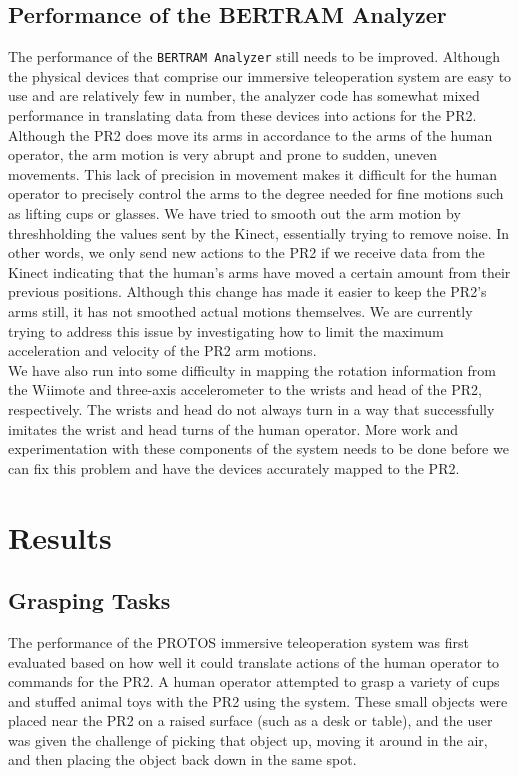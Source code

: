 \documentclass{sig-alternate}
\begin{document}
\subsection {Performance of the BERTRAM Analyzer}
\indent The performance of the {\tt BERTRAM Analyzer} still needs to be improved. Although the physical devices that comprise our immersive teleoperation system are easy to use and are relatively few in number, the analyzer code has somewhat mixed performance in translating data from these devices into actions for the PR2. Although the PR2 does move its arms in accordance to the arms of the human operator, the arm motion is very abrupt and prone to sudden, uneven movements. This lack of precision in movement makes it difficult for the human operator to precisely control the arms to the degree needed for fine motions such as lifting cups or glasses. We have tried to smooth out the arm motion by threshholding the values sent by the Kinect, essentially trying to remove noise. In other words, we only send new actions to the PR2 if we receive data from the Kinect indicating that the human's arms have moved a certain amount from their previous positions. Although this change has made it easier to keep the PR2's arms still, it has not smoothed actual motions themselves. We are currently trying to address this issue by investigating how to limit the maximum acceleration and velocity of the PR2 arm motions.\\
\indent We have also run into some difficulty in mapping the rotation information from the Wiimote and three-axis accelerometer to the wrists and head of the PR2, respectively. The wrists and head do not always turn in a way that successfully imitates the wrist and head turns of the human operator. More work and experimentation with these components of the system needs to be done before we can fix this problem and have the devices accurately mapped to the PR2.

\section{Results}
\label{sec:results}

\subsection{Grasping Tasks}
\indent The performance of the PROTOS immersive teleoperation system was first
evaluated based on how well it could translate actions of
the human operator to commands for the PR2. A human operator attempted to grasp a variety of cups and stuffed animal toys 
with the PR2 using the system. These small objects were placed near the PR2 on a raised surface (such as a desk or table), and the user was given the challenge of
picking that object up, moving it around in the air, and then placing the object back down in the same spot.
\end{document}
